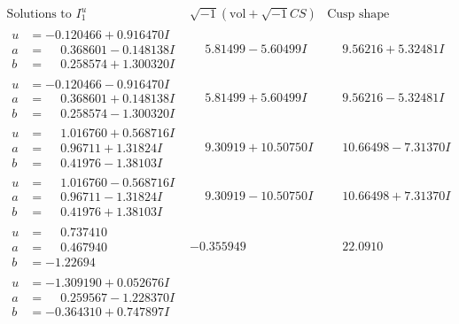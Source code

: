 \documentclass[1p]{elsarticle_modified}
\theoremstyle{definition}
\newcommand{\I}{\sqrt{-1}}
\begin{document}
$$\begin{array}{c|c|c}  
\text{Solutions to }I^u_{1}& \I (\text{vol} + \sqrt{-1}CS) & \text{Cusp shape}\\
 \hline 
\begin{aligned}
u &= -0.120466 + 0.916470 I \\
a &= \phantom{-}0.368601 - 0.148138 I \\
b &= \phantom{-}0.258574 + 1.300320 I\end{aligned}
 & \phantom{-}5.81499 - 5.60499 I & \phantom{-}9.56216 + 5.32481 I \\ \hline\begin{aligned}
u &= -0.120466 - 0.916470 I \\
a &= \phantom{-}0.368601 + 0.148138 I \\
b &= \phantom{-}0.258574 - 1.300320 I\end{aligned}
 & \phantom{-}5.81499 + 5.60499 I & \phantom{-}9.56216 - 5.32481 I \\ \hline\begin{aligned}
u &= \phantom{-}1.016760 + 0.568716 I \\
a &= \phantom{-}0.96711 + 1.31824 I \\
b &= \phantom{-}0.41976 - 1.38103 I\end{aligned}
 & \phantom{-}9.30919 + 10.50750 I & \phantom{-}10.66498 - 7.31370 I \\ \hline\begin{aligned}
u &= \phantom{-}1.016760 - 0.568716 I \\
a &= \phantom{-}0.96711 - 1.31824 I \\
b &= \phantom{-}0.41976 + 1.38103 I\end{aligned}
 & \phantom{-}9.30919 - 10.50750 I & \phantom{-}10.66498 + 7.31370 I \\ \hline\begin{aligned}
u &= \phantom{-}0.737410\phantom{ +0.000000I} \\
a &= \phantom{-}0.467940\phantom{ +0.000000I} \\
b &= -1.22694\phantom{ +0.000000I}\end{aligned}
 & -0.355949\phantom{ +0.000000I} & \phantom{-}22.0910\phantom{ +0.000000I} \\ \hline\begin{aligned}
u &= -1.309190 + 0.052676 I \\
a &= \phantom{-}0.259567 - 1.228370 I \\
b &= -0.364310 + 0.747897 I\end{aligned}

\end{array}$$
\end{document}
